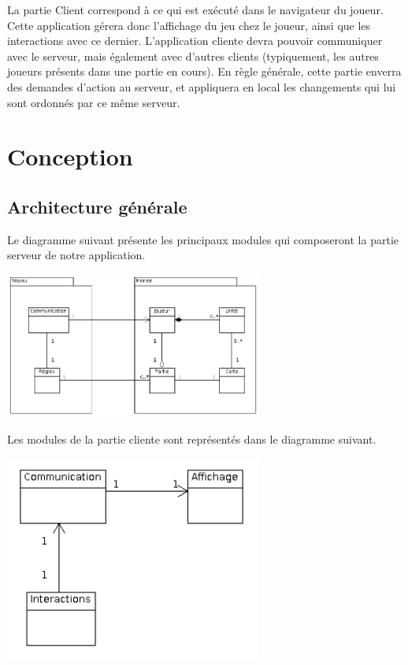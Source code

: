 \documentclass[a4paper,10pt]{report}
\begin{document}
      La partie Client correspond à ce qui est exécuté dans le navigateur du joueur. Cette application gérera donc l'affichage du jeu chez le joueur, ainsi que les interactions avec ce dernier. L'application cliente devra pouvoir communiquer avec le serveur, mais également avec d'autres clients (typiquement, les autres joueurs présents dans une partie en cours). En règle générale, cette partie enverra des demandes d'action au serveur, et appliquera en local les changements qui lui sont ordonnés par ce même serveur. 


  \chapter{Conception}

    \section{Architecture générale}

      Le diagramme suivant présente les principaux modules qui composeront la partie serveur de notre application. 
      
      \includegraphics[width=320px]{diagrammes/moteur_serveur_classes.png}
      
      Les modules de la partie cliente sont représentés dans le diagramme suivant. 
      
      \includegraphics[width=320px]{diagrammes/moteur_client_classes.png}
\end{document}
